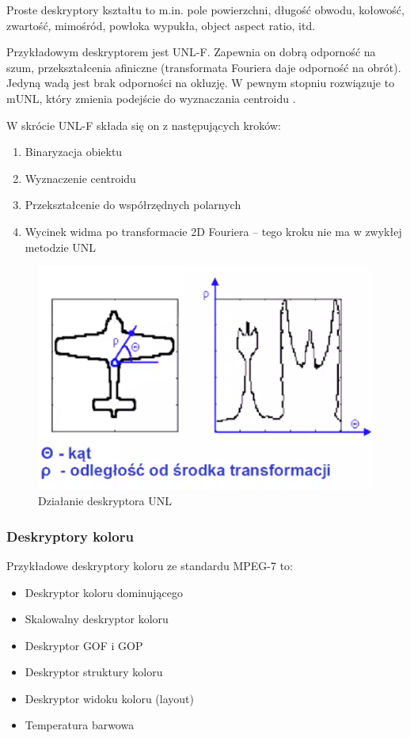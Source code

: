 \documentclass[wi]{zut}
\begin{document}
Proste deskryptory kształtu to m.in. pole powierzchni, długość obwodu, kołowość, zwartość, mimośród, powłoka wypukła, object aspect ratio, itd. \cite{Frejlichowski2020_2}

Przykładowym deskryptorem jest UNL-F. Zapewnia on dobrą odporność na szum, przekształcenia afiniczne (transformata Fouriera daje odporność na obrót). Jedyną wadą jest brak odporności na okluzję. W pewnym stopniu rozwiązuje to mUNL, który zmienia podejście do wyznaczania centroidu  \cite{Frejlichowski2020_2}.

W skrócie UNL-F składa się on z następujących kroków:

\begin{enumerate}
    \item Binaryzacja obiektu
    \item Wyznaczenie centroidu
    \item Przekształcenie do współrzędnych polarnych
    \item Wycinek widma po transformacie 2D Fouriera -- tego kroku nie ma w zwykłej metodzie UNL
\end{enumerate}

\begin{figure}[H]
    \centering
    \includegraphics[width=0.5\linewidth]{images/unl.png}
    \caption{Działanie deskryptora UNL}
    \label{fig:unl}
\end{figure}

\subsubsection{Deskryptory koloru}

Przykładowe deskryptory koloru ze standardu MPEG-7 to:

\begin{itemize}
    \item Deskryptor koloru dominującego
    \item Skalowalny deskryptor koloru
    \item Deskryptor GOF i GOP
    \item Deskryptor struktury koloru
    \item Deskryptor widoku koloru (layout)
    \item Temperatura barwowa \cite{Frejlichowski2020_6}
\end{itemize}
\end{document}
